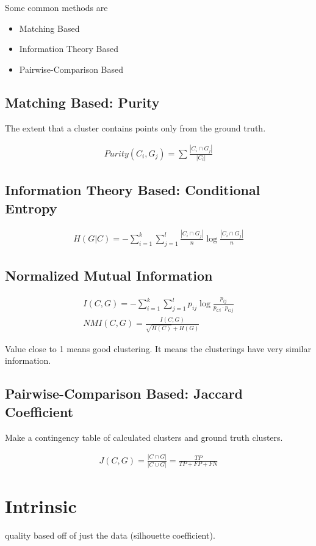 \documentclass[fleqn]{report}
\newcommand{\equations} [1] {
\begin{gather*}
#1
\end{gather*}
}
\begin{document}
Some common methods are 
\begin{itemize}
    \item 
    Matching Based 
    \item 
    Information Theory Based
    \item 
    Pairwise-Comparison Based 
\end{itemize}

\subsection{Matching Based: Purity}
The extent that a cluster contains points only from the 
ground truth.

\equations{
    Purity(C_i, G_j) 
    =
    \sum
    \frac{|C_i \cap G_j|}{|C_i|}
}

\subsection{Information Theory Based: Conditional Entropy}
\equations{
    H(G | C)
    =
    - \sum_{i=1}^{k}
    \sum_{j=1}^{l}
    \frac{|C_i \cap G_j|}{n}
    \log
    \frac{|C_i \cap G_j|}{n}
}

\subsection{Normalized Mutual Information}
\equations{
    I(C, G)
    =
    - \sum_{i=1}^{k}
    \sum_{j=1}^{l}
    p_{ij}
    \log{
    \frac{p_{ij}}{p_{Ci} \cdot p_{Gj}}
    }
    \\ 
    NMI(C, G)
    =
    \frac{I(C; G)}{\sqrt{H(C)} + H(G)}
}

Value close to 1 means good clustering. 
It means the clusterings have very similar information.

\subsection{Pairwise-Comparison Based: Jaccard Coefficient}
Make a contingency table of calculated clusters 
and ground truth clusters. 

\equations{
    J(C, G) 
    =
    \frac{|C \cap G|}{|C \cup G|}
    =
    \frac{TP}{TP + FP + FN}
}

\section{Intrinsic}
quality based off of just the data 
(silhouette coefficient). 
\end{document}
